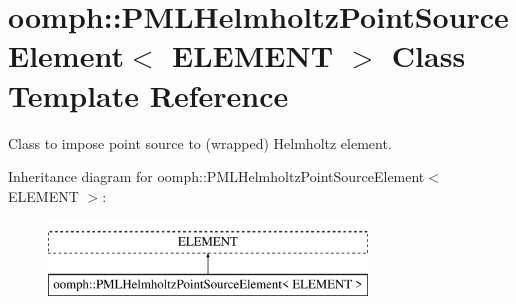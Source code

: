 \hypertarget{classoomph_1_1PMLHelmholtzPointSourceElement}{}\section{oomph\+:\+:P\+M\+L\+Helmholtz\+Point\+Source\+Element$<$ E\+L\+E\+M\+E\+NT $>$ Class Template Reference}
\label{classoomph_1_1PMLHelmholtzPointSourceElement}


Class to impose point source to (wrapped) Helmholtz element.  


Inheritance diagram for oomph\+:\+:P\+M\+L\+Helmholtz\+Point\+Source\+Element$<$ E\+L\+E\+M\+E\+NT $>$\+:\begin{figure}[H]
\begin{center}
\leavevmode
\includegraphics[height=2.000000cm]{classoomph_1_1PMLHelmholtzPointSourceElement}
\end{center}
\end{figure}
